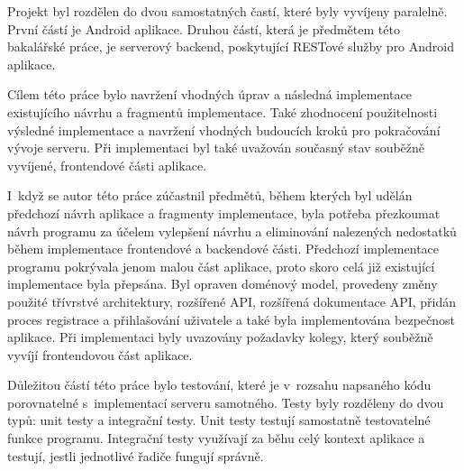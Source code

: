 Projekt byl rozdělen do dvou samostatných častí, které byly vyvíjeny paralelně. První částí je Android aplikace. Druhou částí, která je předmětem této bakalářské práce, je serverový backend, poskytující RESTové služby pro Android aplikace.

Cílem této práce bylo navržení vhodných úprav a následná implementace existujícího návrhu a fragmentů implementace. Také zhodnocení použitelnosti výsledné implementace a navržení vhodných budoucích kroků pro pokračování vývoje serveru. Při implementaci byl také uvažován současný stav souběžně vyvíjené, frontendové části aplikace.

I~když se autor této práce zúčastnil předmětů, během kterých byl udělán předchozí návrh aplikace a fragmenty implementace, byla potřeba přezkoumat návrh programu za účelem vylepšení návrhu a eliminování nalezených nedostatků během implementace frontendové a backendové části. Předchozí implementace programu pokrývala jenom malou část aplikace, proto skoro celá již existující implementace byla přepsána. Byl opraven doménový model, provedeny změny použité třívrstvé architektury, rozšířené API, rozšířená dokumentace API, přidán proces registrace a přihlašování uživatele a také byla implementována bezpečnost aplikace. Při implementaci byly uvazovány požadavky kolegy, který souběžně vyvíjí frontendovou část aplikace.

Důležitou částí této práce bylo testování, které je v~rozsahu napsaného kódu porovnatelné s~implementací serveru samotného. Testy byly rozděleny do dvou typů: unit testy a integrační testy. Unit testy testují samostatně testovatelné funkce programu. Integrační testy využívají za běhu celý kontext aplikace a testují, jestli jednotlivé řadiče fungují správně. 

